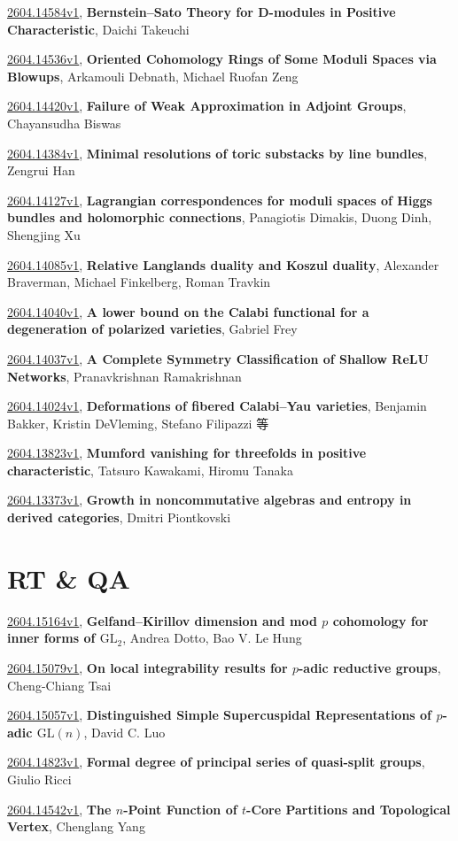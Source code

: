 \documentclass[9pt, a4paper]{article}
\theoremstyle{plain}
\theoremstyle{definition}
\theoremstyle{remark}
\newcommand{\arxiv}[3]{\href{https://arxiv.org/abs/#1}{#1}, \textbf{\textcolor{arxivblue}{#2}}, #3}
\begin{document}
\arxiv{2604.14584v1}{Bernstein--Sato Theory for D-modules in Positive Characteristic}{Daichi Takeuchi}

\arxiv{2604.14536v1}{Oriented Cohomology Rings of Some Moduli Spaces via Blowups}{Arkamouli Debnath, Michael Ruofan Zeng}

\arxiv{2604.14420v1}{Failure of Weak Approximation in Adjoint Groups}{Chayansudha Biswas}

\arxiv{2604.14384v1}{Minimal resolutions of toric substacks by line bundles}{Zengrui Han}

\arxiv{2604.14127v1}{Lagrangian correspondences for moduli spaces of Higgs bundles and holomorphic connections}{Panagiotis Dimakis, Duong Dinh, Shengjing Xu}

\arxiv{2604.14085v1}{Relative Langlands duality and Koszul duality}{Alexander Braverman, Michael Finkelberg, Roman Travkin}

\arxiv{2604.14040v1}{A lower bound on the Calabi functional for a degeneration of polarized varieties}{Gabriel Frey}

\arxiv{2604.14037v1}{A Complete Symmetry Classification of Shallow ReLU Networks}{Pranavkrishnan Ramakrishnan}

\arxiv{2604.14024v1}{Deformations of fibered Calabi--Yau varieties}{Benjamin Bakker, Kristin DeVleming, Stefano Filipazzi 等}

\arxiv{2604.13823v1}{Mumford vanishing for threefolds in positive characteristic}{Tatsuro Kawakami, Hiromu Tanaka}

\arxiv{2604.13373v1}{Growth in noncommutative algebras and entropy in derived categories}{Dmitri Piontkovski}


\section{RT \& QA}
\arxiv{2604.15164v1}{Gelfand--Kirillov dimension and mod $p$ cohomology for inner forms of $\mathrm{GL}_2$}{Andrea Dotto, Bao V. Le Hung}

\arxiv{2604.15079v1}{On local integrability results for $p$-adic reductive groups}{Cheng-Chiang Tsai}

\arxiv{2604.15057v1}{Distinguished Simple Supercuspidal Representations of $p$-adic $\text{GL}(n)$}{David C. Luo}

\arxiv{2604.14823v1}{Formal degree of principal series of quasi-split groups}{Giulio Ricci}

\arxiv{2604.14542v1}{The $n$-Point Function of $t$-Core Partitions and Topological Vertex}{Chenglang Yang}
\end{document}
